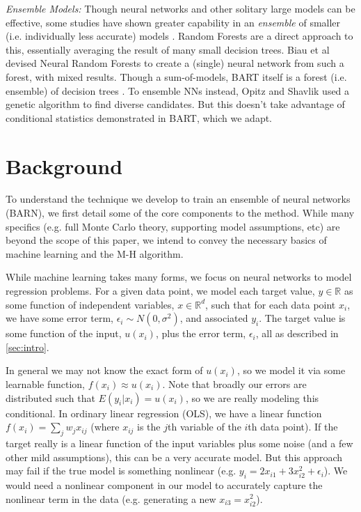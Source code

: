 \documentclass[12pt]{article}
\begin{document}
\emph{Ensemble Models:} Though neural networks and other solitary large models can be effective, some studies have shown greater capability in an \emph{ensemble} of smaller (i.e. individually less accurate) models \cite{hastie2009elements}.  Random Forests \cite{breiman1996bagging} are a direct approach to this, essentially averaging the result of many small decision trees.  Biau et al \cite{biau2019neural} devised Neural Random Forests to create a (single) neural network from such a forest, with mixed results.  Though a sum-of-models, BART itself is a forest (i.e. ensemble) of decision trees \cite{chipman2010bart}.  To ensemble NNs instead, Opitz and Shavlik \cite{opitz1996actively} used a genetic algorithm to find diverse candidates.  But this doesn't take advantage of conditional statistics demonstrated in BART, which we adapt.

\section{Background}\label{sec:background}


To understand the technique we develop to train an ensemble of neural networks (BARN), we first detail some of the core components to the method.  While many specifics (e.g. full Monte Carlo theory, supporting model assumptions, etc) are beyond the scope of this paper, we intend to convey the necessary basics of machine learning and the M-H algorithm.

While machine learning takes many forms, we focus on neural networks to model regression problems.  For a given data point, we model each target value, $y \in \mathbb{R}$ as some function of independent variables, $x \in \mathbb{R}^d$, such that for each data point $x_i$, we have some error term, $\epsilon_i \sim N(0,\sigma^2)$, and associated $y_i$.  The target value is some function of the input, $u(x_i)$, plus the error term, $\epsilon_i$, all as described in \ref{sec:intro}.

In general we may not know the exact form of $u(x_i)$, so we model it via some learnable function, $f(x_i) \approx u(x_i)$.  Note that broadly our errors are distributed such that $E(y_i|x_i) = u(x_i)$, so we are really modeling this conditional.  In ordinary linear regression (OLS), we have a linear function $f(x_i) = \sum_j w_j x_{ij}$ (where $x_{ij}$ is the $j$th variable of the $i$th data point).  If the target really is a linear function of the input variables plus some noise (and a few other mild assumptions), this can be a very accurate model.  But this approach may fail if the true model is something nonlinear (e.g. $y_i = 2x_{i1} + 3x_{i2}^2 + \epsilon_i$).  We would need a nonlinear component in our model to accurately capture the nonlinear term in the data (e.g. generating a new $x_{i3} =x_{i2}^2$).
\end{document}
